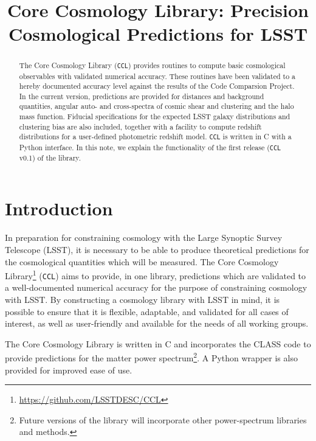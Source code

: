 \documentclass[\docopts]{\docclass}
\begin{document}
 

\title{Core Cosmology Library: Precision Cosmological Predictions for LSST}

\maketitlepre

\begin{abstract}
 
The Core Cosmology Library ({\tt CCL}) provides routines to compute basic cosmological observables with validated numerical accuracy. These routines have been validated to a hereby documented accuracy level against the results of the Code Comparsion Project. In the current version, predictions are provided for distances and background quantities, angular auto- and cross-spectra of cosmic shear and clustering and the halo mass function. Fiducial specifications for the expected LSST galaxy distributions and clustering bias are also included, together with a facility to compute redshift distributions for a user-defined photometric redshift model. {\tt CCL} is written in C with a Python interface. In this note, we explain the functionality of the first release ({\tt CCL} v0.1) of the library. 

\end{abstract}


\maketitlepost

\newpage
\tableofcontents{}
\newpage

\section{Introduction}
\label{sec:intro}

In preparation for constraining cosmology with the Large Synoptic Survey Telescope (LSST), it is necessary to be able to produce theoretical predictions for the cosmological quantities which will be measured. The Core Cosmology Library\footnote{\url{https://github.com/LSSTDESC/CCL}} ({\tt CCL}) aims to provide, in one library, predictions which are validated to a well-documented numerical accuracy for the purpose of constraining cosmology with LSST. By constructing a cosmology library with LSST in mind, it is possible to ensure that it is flexible, adaptable, and validated for all cases of interest, as well as user-friendly and available for the needs of all working groups. 

The Core Cosmology Library is written in C and incorporates the CLASS code \cite{class} to provide predictions for the matter power spectrum\footnote{Future versions of the library will incorporate other power-spectrum libraries and methods.}. A Python wrapper is also provided for improved ease of use. 
\end{document}
